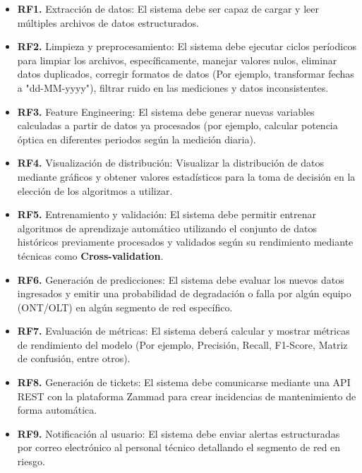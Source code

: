 \documentclass[12pt,a4paper]{article}
\begin{document}
                    \begin{itemize}
                        \item \textbf{RF1.} Extracción de datos: El sistema debe ser capaz de cargar y leer múltiples archivos de datos estructurados.
                        \item \textbf{RF2.} Limpieza y preprocesamiento: El sistema debe ejecutar ciclos períodicos para limpiar los archivos, específicamente, manejar valores nulos, eliminar datos duplicados, corregir formatos de datos (Por ejemplo, transformar fechas a "dd-MM-yyyy"), filtrar ruido en las mediciones y datos inconsistentes.
                        \item \textbf{RF3.} Feature Engineering: El sistema debe generar nuevas variables calculadas a partir de datos ya procesados (por ejemplo, calcular potencia óptica en diferentes periodos según la medición diaria).
                        \item \textbf{RF4.} Visualización de distribución: Visualizar la distribución de datos mediante gráficos y obtener valores estadísticos para la toma de decisión en la elección de los algoritmos a utilizar.
                        \item \textbf{RF5.} Entrenamiento y validación: El sistema debe permitir entrenar algoritmos de aprendizaje automático utilizando el conjunto de datos históricos previamente procesados y validados según su rendimiento mediante técnicas como \textbf{Cross-validation}.
                        \item \textbf{RF6.} Generación de predicciones: El sistema debe evaluar los nuevos datos ingresados y emitir una probabilidad de degradación o falla por algún equipo (ONT/OLT) en algún segmento de red específico.
                        \item \textbf{RF7.} Evaluación de métricas: El sistema deberá calcular y mostrar métricas de rendimiento del modelo (Por ejemplo, Precisión, Recall, F1-Score, Matriz de confusión, entre otros). 
                        \item \textbf{RF8.} Generación de tickets: El sistema debe comunicarse mediante una API REST con la plataforma Zammad para crear incidencias de mantenimiento de forma automática.
                        \item \textbf{RF9.} Notificación al usuario: El sistema debe enviar alertas estructuradas por correo electrónico al personal técnico detallando el segmento de red en riesgo.
                    \end{itemize}
\end{document}
